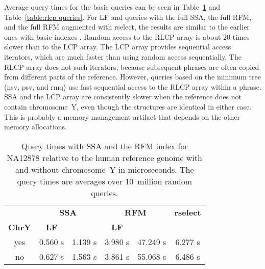 \documentclass[a4paper,11pt]{llncs}
\newcommand{\SSA}{\textsf{SSA}}
\newcommand{\RFM}{\textsf{RFM}}
\newcommand{\LCP}{\textsf{LCP}}
\newcommand{\RLCP}{\textsf{RLCP}}
\newcommand{\rselect}{\textsf{rselect}}
\newcommand{\LF}{\textsf{LF}}
\newcommand{\Psiop}{\textsf{\textPsi}}
\newcommand{\nsv}{\textsf{nsv}}
\newcommand{\psv}{\textsf{psv}}
\newcommand{\rmq}{\textsf{rmq}}
\newcommand{\mus}{\textmu{}s}
\begin{document}
Average query times for the basic queries can be seen in Table~\ref{table:rfm queries} and Table~\ref{table:rlcp queries}. For \LF{} and \Psiop{} queries with the full \SSA{}, the full \RFM, and the full \RFM{} augmented with \rselect, the results are similar to the earlier ones with basic indexes \cite{Boucher2015}. Random access to the \RLCP{} array is about 20 times slower than to the \LCP{} array. The \LCP{} array provides sequential access iterators, which are much faster than using random access sequentially. The \RLCP{} array does not such iterators, because subsequent phrases are often copied from different parts of the reference. However, queries based on the minimum tree (\nsv, \psv, and \rmq) use fast sequential access to the \RLCP{} array within a phrase. \SSA{} and the \LCP{} array are consistently slower when the reference does not contain chromosome~Y, even though the structures are identical in either case. This is probably a memory management artifact that depends on the other memory allocations.

\begin{table}
\caption{Query times with \SSA{} and the \RFM{} index for NA12878 relative to the human reference genome with and without chromosome~Y in microseconds. The query times are averages over 10~million random queries.}\label{table:rfm queries}
\setlength{\extrarowheight}{2pt}
\setlength{\tabcolsep}{3pt}
\begin{center}
\begin{tabular}{c|cc|cc|c}
\hline
 & \multicolumn{2}{c|}{\textbf{\SSA}} & \multicolumn{2}{c|}{\textbf{\RFM}} & \textbf{\rselect} \\
\textbf{ChrY} & \textbf{\LF} & \textbf{\Psiop} & \textbf{\LF} & \textbf{\Psiop} & \textbf{\Psiop} \\
\hline
yes & 0.560 \mus & 1.139 \mus & 3.980 \mus & 47.249 \mus & 6.277 \mus \\
no  & 0.627 \mus & 1.563 \mus & 3.861 \mus & 55.068 \mus & 6.486 \mus \\
\hline
\end{tabular}
\end{center}
\end{table}
\end{document}

